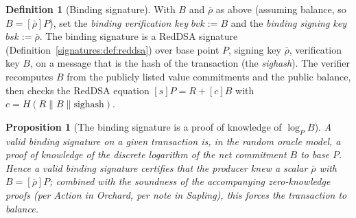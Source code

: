 \documentclass[11pt,a4paper]{article}
\newtheorem{proposition}[theorem]{Proposition}
\theoremstyle{definition}
\newtheorem{definition}[theorem]{Definition}
\theoremstyle{remark}
\begin{document}
\begin{definition}[Binding signature]\label{signatures:def:binding}
With \(B\) and \(\bar\rho\) as above (assuming balance, so \(B = [\bar\rho]P\)), set the \emph{binding verification key} \(\mathit{bvk} := B\) and the \emph{binding signing key} \(\mathit{bsk} := \bar\rho\). The binding signature is a RedDSA signature (Definition~\ref{signatures:def:reddsa}) over base point \(P\), signing key \(\bar\rho\), verification key \(B\), on a message that is the hash of the transaction (the \emph{sighash}). The verifier recomputes \(B\) from the publicly listed value commitments and the public balance, then checks the RedDSA equation \([s]P = R + [c]B\) with \(c = H(R\|B\|\text{sighash})\).
\end{definition}

\begin{proposition}[The binding signature is a proof of knowledge of \(\log_P B\)]\label{signatures:prop:binding-pok}
A valid binding signature on a given transaction is, in the random oracle model, a proof of knowledge of the discrete logarithm of the net commitment \(B\) to base \(P\). Hence a valid binding signature certifies that the producer knew a scalar \(\bar\rho\) with \(B = [\bar\rho]P\); combined with the soundness of the accompanying zero-knowledge proofs (per Action in Orchard, per note in Sapling), this forces the transaction to balance.
\end{proposition}
\end{document}
